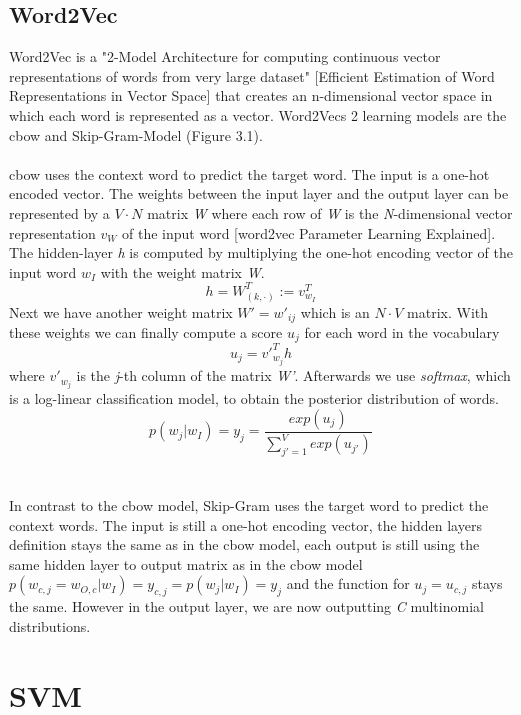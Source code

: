 \documentclass[a4paper, 11pt,titlepage,oneside,openany]{book}
\begin{document}
\subsection{Word2Vec}
Word2Vec is a "2-Model Architecture for computing continuous vector representations of words from very large dataset" [Efficient Estimation of Word Representations in Vector Space] that creates an n-dimensional vector space in which each word is represented as a vector. Word2Vecs 2 learning models are the \gls{cbow} and Skip-Gram-Model (Figure 3.1).\\
\\
\noindent \gls{cbow} uses the context word to predict the target word. The input is a one-hot encoded vector. The weights between the input layer and the output layer can be represented by a $V \cdot N$ matrix \textit{W} where each row of \textit{W} is the \textit{N}-dimensional vector representation $v_W$ of the input word [word2vec Parameter Learning Explained]. The hidden-layer \textit{h} is computed by multiplying the one-hot encoding vector of the input word $w_I$ with the weight matrix \textit{W}.
\[
h=W_{(k, \cdot)}^{T}:=v_{w_I}^{T}
\] 
Next we have another weight matrix $W'={w'_{ij}}$ which is an $N \cdot V$ matrix. With these weights we can finally compute a score $u_j$ for each word in the vocabulary
\[
u_{j}={v'}_{w_j}^{T}h
\] where ${v'}_{w_j}$ is the \textit{j}-th column of the matrix \textit{W'}. Afterwards we use \textit{softmax}, which is a log-linear classification model, to obtain the posterior distribution of words.
\[
p(w_j|w_I)=y_j=\frac{exp(u_j)}{\sum_{j'=1}^V exp(u_{j'})}
\] \\
\\
\noindent In contrast to the \gls{cbow} model,  Skip-Gram uses the target word to predict the context words. The input is still a one-hot encoding vector, the hidden layers definition stays the same as in the \gls{cbow} model, each output is still using the same hidden layer to output matrix as in the \gls{cbow} model $p(w_{c,j}=w_{O,c}|w_I)=y_{c,j} = p(w_j|w_I)=y_j$ and the function for $u_j=u_{c,j}$ stays the same. However in the output layer, we are now outputting \textit{C} multinomial distributions. 
\section{SVM}
\end{document}
